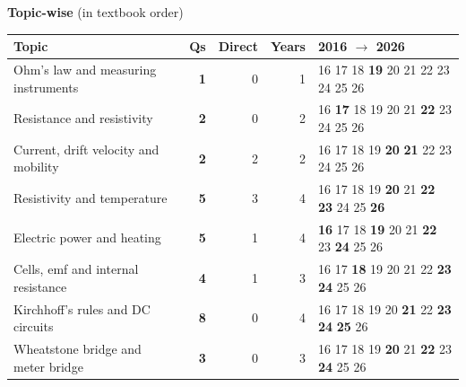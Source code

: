 {\small\textbf{\color{crimson}Topic-wise} (in textbook order)\par\smallskip
\begin{tabularx}{\linewidth}{@{}>{\raggedright\arraybackslash}Xrrrl@{}}\toprule
Topic & Qs & Direct & Years & 2016 $\rightarrow$ 2026\\\midrule
Ohm's law and measuring instruments & \textbf{1} & 0 & 1 & {\scriptsize {\color{gray!45}16} {\color{gray!45}17} {\color{gray!45}18} \textbf{19} {\color{gray!45}20} {\color{gray!45}21} {\color{gray!45}22} {\color{gray!45}23} {\color{gray!45}24} {\color{gray!45}25} {\color{gray!45}26}}\\
Resistance and resistivity & \textbf{2} & 0 & 2 & {\scriptsize {\color{gray!45}16} \textbf{17} {\color{gray!45}18} {\color{gray!45}19} {\color{gray!45}20} {\color{gray!45}21} \textbf{22} {\color{gray!45}23} {\color{gray!45}24} {\color{gray!45}25} {\color{gray!45}26}}\\
Current, drift velocity and mobility & \textbf{2} & 2 & 2 & {\scriptsize {\color{gray!45}16} {\color{gray!45}17} {\color{gray!45}18} {\color{gray!45}19} \textbf{20} \textbf{21} {\color{gray!45}22} {\color{gray!45}23} {\color{gray!45}24} {\color{gray!45}25} {\color{gray!45}26}}\\
Resistivity and temperature & \textbf{5} & 3 & 4 & {\scriptsize {\color{gray!45}16} {\color{gray!45}17} {\color{gray!45}18} {\color{gray!45}19} \textbf{20} {\color{gray!45}21} \textbf{22} \textbf{23} {\color{gray!45}24} {\color{gray!45}25} \textbf{26}}\\
Electric power and heating & \textbf{5} & 1 & 4 & {\scriptsize \textbf{16} {\color{gray!45}17} {\color{gray!45}18} \textbf{19} {\color{gray!45}20} {\color{gray!45}21} \textbf{22} {\color{gray!45}23} \textbf{24} {\color{gray!45}25} {\color{gray!45}26}}\\
Cells, emf and internal resistance & \textbf{4} & 1 & 3 & {\scriptsize {\color{gray!45}16} {\color{gray!45}17} \textbf{18} {\color{gray!45}19} {\color{gray!45}20} {\color{gray!45}21} {\color{gray!45}22} \textbf{23} \textbf{24} {\color{gray!45}25} {\color{gray!45}26}}\\
Kirchhoff's rules and DC circuits & \textbf{8} & 0 & 4 & {\scriptsize {\color{gray!45}16} {\color{gray!45}17} {\color{gray!45}18} {\color{gray!45}19} {\color{gray!45}20} \textbf{21} {\color{gray!45}22} \textbf{23} \textbf{24} \textbf{25} {\color{gray!45}26}}\\
Wheatstone bridge and meter bridge & \textbf{3} & 0 & 3 & {\scriptsize {\color{gray!45}16} {\color{gray!45}17} {\color{gray!45}18} {\color{gray!45}19} \textbf{20} {\color{gray!45}21} \textbf{22} {\color{gray!45}23} \textbf{24} {\color{gray!45}25} {\color{gray!45}26}}\\
\bottomrule\end{tabularx}}\par\medskip
